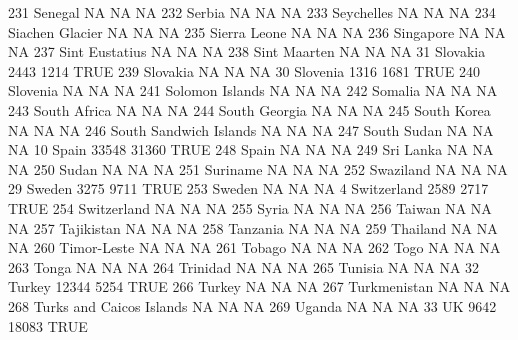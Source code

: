 \documentclass [a4paper] {article}
\begin{document}
\begin{Schunk}
\begin{Soutput}
231                             Senegal    NA    NA   NA
232                              Serbia    NA    NA   NA
233                          Seychelles    NA    NA   NA
234                     Siachen Glacier    NA    NA   NA
235                        Sierra Leone    NA    NA   NA
236                           Singapore    NA    NA   NA
237                      Sint Eustatius    NA    NA   NA
238                        Sint Maarten    NA    NA   NA
31                             Slovakia  2443  1214 TRUE
239                            Slovakia    NA    NA   NA
30                             Slovenia  1316  1681 TRUE
240                            Slovenia    NA    NA   NA
241                     Solomon Islands    NA    NA   NA
242                             Somalia    NA    NA   NA
243                        South Africa    NA    NA   NA
244                       South Georgia    NA    NA   NA
245                         South Korea    NA    NA   NA
246              South Sandwich Islands    NA    NA   NA
247                         South Sudan    NA    NA   NA
10                                Spain 33548 31360 TRUE
248                               Spain    NA    NA   NA
249                           Sri Lanka    NA    NA   NA
250                               Sudan    NA    NA   NA
251                            Suriname    NA    NA   NA
252                           Swaziland    NA    NA   NA
29                               Sweden  3275  9711 TRUE
253                              Sweden    NA    NA   NA
4                           Switzerland  2589  2717 TRUE
254                         Switzerland    NA    NA   NA
255                               Syria    NA    NA   NA
256                              Taiwan    NA    NA   NA
257                          Tajikistan    NA    NA   NA
258                            Tanzania    NA    NA   NA
259                            Thailand    NA    NA   NA
260                         Timor-Leste    NA    NA   NA
261                              Tobago    NA    NA   NA
262                                Togo    NA    NA   NA
263                               Tonga    NA    NA   NA
264                            Trinidad    NA    NA   NA
265                             Tunisia    NA    NA   NA
32                               Turkey 12344  5254 TRUE
266                              Turkey    NA    NA   NA
267                        Turkmenistan    NA    NA   NA
268            Turks and Caicos Islands    NA    NA   NA
269                              Uganda    NA    NA   NA
33                                   UK  9642 18083 TRUE

\end{Soutput}
\end{Schunk}
\end{document}

